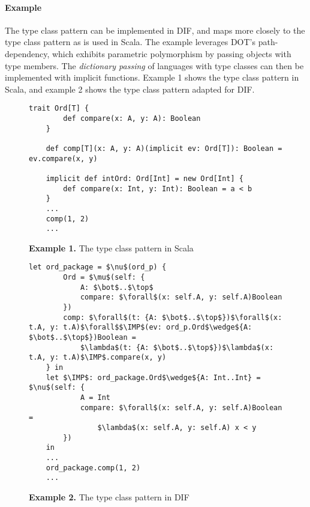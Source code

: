 \paragraph{Example} The type class pattern \cite{OBLB18} can be implemented in
DIF, and maps more closely to the type class pattern as is used in Scala. The
example leverages DOT's path-dependency, which exhibits parametric polymorphism
by passing objects with type members. The \emph{dictionary passing} of languages
with type classes can then be implemented with implicit functions. Example 1
shows the type class pattern in Scala, and example 2 shows the type class
pattern adapted for DIF.

\begin{figure*}[h]
\begin{lstlisting}[mathescape]
    trait Ord[T] {
        def compare(x: A, y: A): Boolean
    }

    def comp[T](x: A, y: A)(implicit ev: Ord[T]): Boolean = ev.compare(x, y)

    implicit def intOrd: Ord[Int] = new Ord[Int] {
        def compare(x: Int, y: Int): Boolean = a < b
    }
    ...
    comp(1, 2)
    ...
\end{lstlisting}
\caption*{\textbf{Example 1.} The type class pattern in Scala}
\end{figure*}

\begin{figure*}[h]
\begin{lstlisting}[mathescape]
    let ord_package = $\nu$(ord_p) {
        Ord = $\mu$(self: {
            A: $\bot$..$\top$
            compare: $\forall$(x: self.A, y: self.A)Boolean
        })
        comp: $\forall$(t: {A: $\bot$..$\top$})$\forall$(x: t.A, y: t.A)$\forall$$\IMP$(ev: ord_p.Ord$\wedge${A: $\bot$..$\top$})Boolean =
            $\lambda$(t: {A: $\bot$..$\top$})$\lambda$(x: t.A, y: t.A)$\IMP$.compare(x, y)
    } in
    let $\IMP$: ord_package.Ord$\wedge${A: Int..Int} = $\nu$(self: {
            A = Int
            compare: $\forall$(x: self.A, y: self.A)Boolean =
                $\lambda$(x: self.A, y: self.A) x < y
        })
    in
    ...
    ord_package.comp(1, 2)
    ...
\end{lstlisting}
\caption*{\textbf{Example 2.} The type class pattern in DIF}
\end{figure*}
